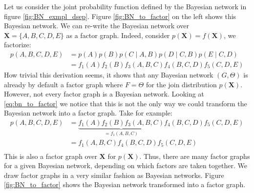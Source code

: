 \begin{exmp}
Let us consider the joint probability function defined by
the Bayesian network in figure \ref{fig:BN_exmpl_dsep}. Figure
\ref{fig:BN_to_factor} on the left shows this Bayesian network.
We can re-write the Bayesian network over $\textbf{X} = \{
A, B, C, D, E\}$ as a factor graph. Indeed, consider $p(\textbf{X})
= f(\textbf{X})$, we factorize:
\begin{equation}\label{eq:bn_to_factor}\begin{split}
p(A,B,C,D,E) 
	&= p(A)p(B)p(C \mid A, B)p(D \mid C, B)p(E \mid C, D)\\
	&= f_1(A)f_2(B)f_3(A, B, C)f_4(B, C, D)f_5(C, D, E)
\end{split}\end{equation}
How trivial this derivation seems, it shows that any Bayesian
network $(G, \Theta)$ is already by default a factor graph where
$F = \Theta$ for the join distribution $p(\textbf{X})$. However,
not every factor graph is a Bayesian network. Looking at 
\ref{eq:bn_to_factor} we notice that this is not the only way
we could transform the Bayesian network into a factor graph.
Take for example:
\begin{equation}\begin{split}
p(A,B,C,D,E) 
	&= \underbrace{f_1(A)f_2(B)f_3(A, B, C)}_{= f_1(A,B,C)}
			f_4(B, C, D)f_5(C, D, E) \\
	&= f_1(A,B,C)f_4(B, C, D)f_5(C, D, E) \\
\end{split}\end{equation}
This is also a factor graph over $\textbf{X}$ for $p(\textbf{X})$. 
Thus, there are many factor graphs for a given Bayesian network,
depending on which factors are taken together. We draw factor graphs
in a very similar fashion as Bayesian networks. Figure 
\ref{fig:BN_to_factor} shows the Bayesian network transformed into
a factor graph.

\begin{figure}[h!]
\centering
\begin{minipage}{0.4\textwidth}
\end{minipage}
\end{figure}
\end{exmp}
